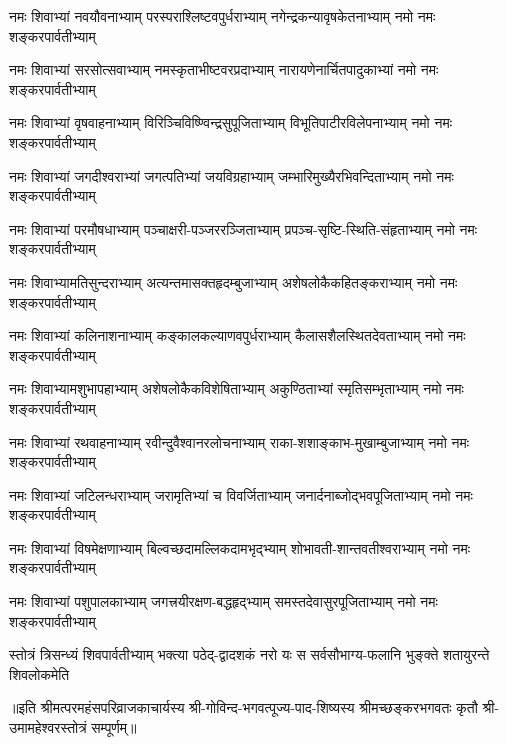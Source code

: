 
\begin{AutoCols}[\maxColumns]
\fourlineindentedshloka
{नमः शिवाभ्यां नवयौवनाभ्याम्‌}
{परस्पराश्लिष्टवपुर्धराभ्याम्‌}
{नगेन्द्रकन्यावृषकेतनाभ्याम्‌}
{नमो नमः शङ्करपार्वतीभ्याम्‌}%

\fourlineindentedshloka
{नमः शिवाभ्यां सरसोत्सवाभ्याम्‌}
{नमस्कृताभीष्टवरप्रदाभ्याम्‌}
{नारायणेनार्चितपादुकाभ्यां}
{नमो नमः शङ्करपार्वतीभ्याम्‌}%

\fourlineindentedshloka
{नमः शिवाभ्यां वृषवाहनाभ्याम्‌}
{विरिञ्चिविष्ण्विन्द्रसुपूजिताभ्याम्‌}
{विभूतिपाटीरविलेपनाभ्याम्‌}
{नमो नमः शङ्करपार्वतीभ्याम्‌}%

\fourlineindentedshloka
{नमः शिवाभ्यां जगदीश्वराभ्यां}
{जगत्पतिभ्यां जयविग्रहाभ्याम्‌}
{जम्भारिमुख्यैरभिवन्दिताभ्याम्‌}
{नमो नमः शङ्करपार्वतीभ्याम्‌}%

\fourlineindentedshloka
{नमः शिवाभ्यां परमौषधाभ्याम्‌}
{पञ्चाक्षरी-पञ्जररञ्जिताभ्याम्‌}
{प्रपञ्च-सृष्टि-स्थिति-संहृताभ्याम्‌}
{नमो नमः शङ्करपार्वतीभ्याम्‌}%

\fourlineindentedshloka
{नमः शिवाभ्यामतिसुन्दराभ्याम्‌}
{अत्यन्तमासक्तहृदम्बुजाभ्याम्‌}
{अशेषलोकैकहितङ्कराभ्याम्‌}
{नमो नमः शङ्करपार्वतीभ्याम्‌}%

\fourlineindentedshloka
{नमः शिवाभ्यां कलिनाशनाभ्याम्‌}
{कङ्कालकल्याणवपुर्धराभ्याम्‌}
{कैलासशैलस्थितदेवताभ्याम्‌}
{नमो नमः शङ्करपार्वतीभ्याम्‌}%

\fourlineindentedshloka
{नमः शिवाभ्यामशुभापहाभ्याम्‌}
{अशेषलोकैकविशेषिताभ्याम्‌}
{अकुण्ठिताभ्यां स्मृतिसम्भृताभ्याम्‌}
{नमो नमः शङ्करपार्वतीभ्याम्‌}%

\fourlineindentedshloka
{नमः शिवाभ्यां रथवाहनाभ्याम्‌}
{रवीन्दुवैश्वानरलोचनाभ्याम्‌}
{राका-शशाङ्काभ-मुखाम्बुजाभ्याम्‌}
{नमो नमः शङ्करपार्वतीभ्याम्‌}%

\fourlineindentedshloka
{नमः शिवाभ्यां जटिलन्धराभ्याम्‌}
{जरामृतिभ्यां च विवर्जिताभ्याम्‌}
{जनार्दनाब्जोद्भवपूजिताभ्याम्‌}
{नमो नमः शङ्करपार्वतीभ्याम्‌}%

\fourlineindentedshloka
{नमः शिवाभ्यां विषमेक्षणाभ्याम्‌}
{बिल्वच्छदामल्लिकदामभृद्‌भ्याम्‌}
{शोभावती-शान्तवतीश्वराभ्याम्‌}
{नमो नमः शङ्करपार्वतीभ्याम्‌}%

\fourlineindentedshloka
{नमः शिवाभ्यां पशुपालकाभ्याम्‌}
{जगत्त्रयीरक्षण-बद्धहृद्‌भ्याम्‌}
{समस्तदेवासुरपूजिताभ्याम्‌}
{नमो नमः शङ्करपार्वतीभ्याम्‌}%

\fourlineindentedshloka
{स्तोत्रं त्रिसन्ध्यं शिवपार्वतीभ्याम्‌}
{भक्त्या पठेद्-द्वादशकं नरो यः}
{स सर्वसौभाग्य-फलानि भुङ्क्ते}
{शतायुरन्ते शिवलोकमेति}%

{॥इति श्रीमत्परमहंसपरिव्राजकाचार्यस्य श्री-गोविन्द-भगवत्पूज्य-पाद-शिष्यस्य
श्रीमच्छङ्करभगवतः कृतौ श्री-उमामहेश्वरस्तोत्रं सम्पूर्णम्‌॥}

\end{AutoCols}